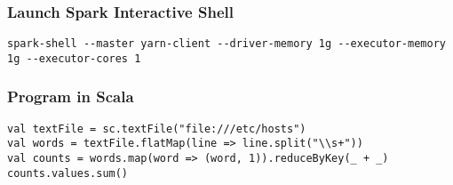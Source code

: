 \subsubsection{Launch Spark Interactive
Shell}\label{launch-spark-interactive-shell}

\begin{lstlisting}
spark-shell --master yarn-client --driver-memory 1g --executor-memory 1g --executor-cores 1
\end{lstlisting}

\subsubsection{Program in Scala}\label{program-in-scala}

\begin{lstlisting}
val textFile = sc.textFile("file:///etc/hosts")
val words = textFile.flatMap(line => line.split("\\s+"))
val counts = words.map(word => (word, 1)).reduceByKey(_ + _)
counts.values.sum()
\end{lstlisting}


